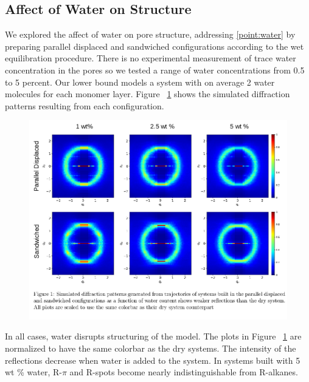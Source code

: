 \documentclass{article}
\begin{document}
  \subsection{Affect of Water on Structure}

  We explored the affect of water on pore structure, addressing \ref{point:water}
  by preparing parallel displaced and sandwiched configurations according to the
  wet equilibration procedure. There is no experimental measurement of trace
  water concentration in the pores so we tested a range of water concentrations
  from 0.5 to 5 percent. Our lower bound models a system with on average 2 water
  molecules for each monomer layer. Figure ~\ref{fig:solvation} shows the
  simulated diffraction patterns resulting from each configuration.

  \begin{figure}
	\centering
	\includegraphics[width=\textwidth]{solvation.png}  %
	\caption{}
	\label{fig:solvation}
  \end{figure}

  In all cases, water disrupts structuring of the model. The plots in Figure
  ~\ref{fig:solvation} are normalized to have the same colorbar as the dry
  systems. The intensity of the reflections decrease when water is added to the
  system. In systems built with 5 wt \% water, R-$\pi$ and R-spots
  become nearly indistinguishable from R-alkanes.
\end{document}
